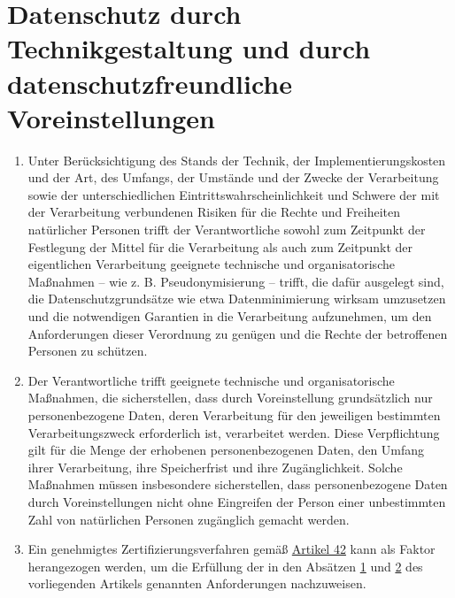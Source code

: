 \chapter{Datenschutz durch Technikgestaltung und durch datenschutzfreundliche Voreinstellungen}
\label{ch:25}


\begin{enumerate}

  \item Unter Berücksichtigung des Stands der Technik, der Implementierungskosten und der Art, des Umfangs, der Umstände
   und der Zwecke der Verarbeitung sowie der unterschiedlichen Eintrittswahrscheinlichkeit und Schwere der mit der
   Verarbeitung verbundenen Risiken für die Rechte und Freiheiten natürlicher Personen trifft der Verantwortliche
   sowohl zum Zeitpunkt der Festlegung der Mittel für die Verarbeitung als auch zum Zeitpunkt der eigentlichen
   Verarbeitung geeignete technische und organisatorische Maßnahmen -- wie z. B. Pseudonymisierung -- trifft, die dafür
   ausgelegt sind, die Datenschutzgrundsätze wie etwa Datenminimierung wirksam umzusetzen und die notwendigen Garantien
   in die Verarbeitung aufzunehmen, um den Anforderungen dieser Verordnung zu genügen und die Rechte der betroffenen
   Personen zu schützen.
  \label{itm:25-1}

  \item Der Verantwortliche trifft geeignete technische und organisatorische Maßnahmen, die sicherstellen, dass durch
   Voreinstellung grundsätzlich nur personenbezogene Daten, deren Verarbeitung für den jeweiligen bestimmten
   Verarbeitungszweck erforderlich ist, verarbeitet werden. Diese Verpflichtung gilt für die Menge der erhobenen
   personenbezogenen Daten, den Umfang ihrer Verarbeitung, ihre Speicherfrist und ihre Zugänglichkeit. Solche Maßnahmen
   müssen insbesondere sicherstellen, dass personenbezogene Daten durch Voreinstellungen nicht ohne Eingreifen der
   Person einer unbestimmten Zahl von natürlichen Personen zugänglich gemacht werden.
  \label{itm:25-2}

  \item Ein genehmigtes Zertifizierungsverfahren gemäß \hyperref[ch:42]{Artikel 42} kann als Faktor herangezogen werden,
   um die Erfüllung der in den Absätzen \hyperref[itm:25-1]{1} und \hyperref[itm:25-2]{2} des vorliegenden Artikels
   genannten Anforderungen nachzuweisen.
  \label{itm:25-3}

\end{enumerate}


